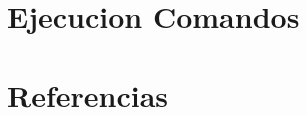 \documentclass[paper=a4, fontsize=12pt]{article} 		%
\numberwithin{equation}{section}						%
\numberwithin{table}{section} 							%
\begin{document}
\section{Ejecucion Comandos}
\section{Referencias}
\end{document}
